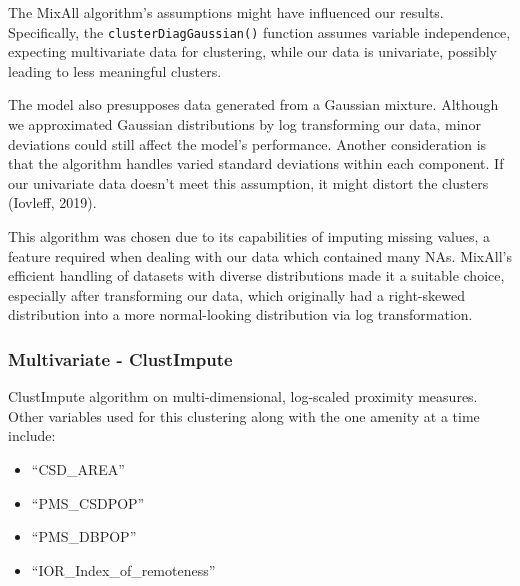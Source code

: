 \documentclass[11pt, a4paper]{article}
\begin{document}
The MixAll algorithm's assumptions might have influenced our results. Specifically, the \texttt{clusterDiagGaussian()} function assumes variable independence, expecting multivariate data for clustering, while our data is univariate, possibly leading to less meaningful clusters.
\par
The model also presupposes data generated from a Gaussian mixture. Although we approximated Gaussian distributions by log transforming our data, minor deviations could still affect the model's performance. Another consideration is that the algorithm handles varied standard deviations within each component. If our univariate data doesn't meet this assumption, it might distort the clusters (Iovleff, 2019).
\par
This algorithm was chosen due to its capabilities of imputing missing values, a feature required when dealing with our data which contained many NAs. MixAll's efficient handling of datasets with diverse distributions made it a suitable choice, especially after transforming our data, which originally had a right-skewed distribution into a more normal-looking distribution via log transformation.







\subsubsection{Multivariate - ClustImpute}

ClustImpute algorithm on multi-dimensional, log-scaled proximity measures. Other variables used for this clustering along with the one amenity at a time include:
\begin{itemize}
\item ``CSD\_AREA''
\item ``PMS\_CSDPOP''
\item ``PMS\_DBPOP''
\item ``IOR\_Index\_of\_remoteness''
\end{itemize}
\end{document}
